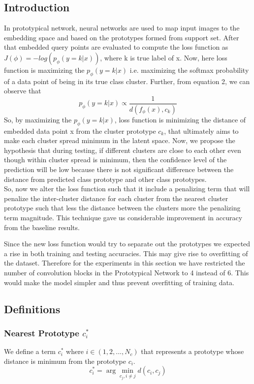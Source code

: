 \subsection{Introduction}
In prototypical network, neural networks are used to map input images to the embedding space and based on the prototypes formed from support set. After that embedded query points are evaluated to compute the loss function as \(J(\phi) = -log(p_\phi (y=k|x))\), where k is true label of x. Now, here loss function is maximizing the \(p_\phi(y=k|x)\) i.e. maximizing the softmax probability of a data point of being in its true class cluster. Further, from equation 2, we can observe that  \[p_\phi(y=k|x) \propto \frac{1}{d(f_\phi(x),c_k)}\]
So, by maximizing the \(p_\phi(y=k|x)\), loss function is minimizing the distance of embedded data point x from the cluster prototype \(c_k\), that ultimately aims to make each cluster spread minimum in the latent space. Now, we propose the  hypothesis that during testing, if different clusters are close to each other even though within cluster spread is minimum, then the confidence level of the prediction will be low because there is not significant difference between the distance from predicted class prototype and other class prototypes.\\

So, now we alter the loss function such that it include a penalizing term that will penalize the inter-cluster distance for each cluster from the nearest cluster prototype such that less the distance between the clusters more the penalizing term magnitude. This technique gave us considerable improvement in accuracy from the  baseline results.

Since the new loss function would try to separate out the prototypes we expected a rise in both training and testing accuracies. This may give rise to overfitting of the dataset. Therefore for the experiments in this section we have restricted the number of convolution blocks in the Prototypical Network to 4 instead of 6. This would make the model simpler and thus prevent overfitting of training data.
\subsection{Definitions}

\subsubsection{Nearest Prototype \(c_i^*\)}
We define a term \(c_{i}^*\) where \(i\in(1,2,...,N_c)\)  that represents a prototype whose distance is minimum from the prototype \(c_i\).
\[
	{c_i^* = \arg\min_{c_j , i\neq j} d(c_i,c_j)}
\]
